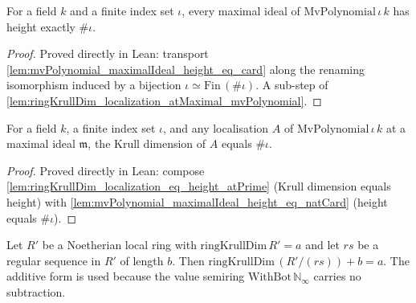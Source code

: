 \begin{lemma}
  \label{lem:mvPolynomial_maximalIdeal_height_eq_natCard}
  For a field \(k\) and a finite index set \(\iota\), every maximal ideal of
  \(\mathrm{MvPolynomial}\,\iota\,k\) has height exactly \(\#\iota\).
\end{lemma}

\begin{proof}
  Proved directly in Lean: transport
  \cref{lem:mvPolynomial_maximalIdeal_height_eq_card} along the renaming isomorphism
  induced by a bijection \(\iota \simeq \mathrm{Fin}\,(\#\iota)\). A sub-step of
  \cref{lem:ringKrullDim_localization_atMaximal_mvPolynomial}.
\end{proof}

\begin{lemma}
  \label{lem:ringKrullDim_localization_atMaximal_mvPolynomial}
  For a field \(k\), a finite index set \(\iota\), and any localisation \(A\) of
  \(\mathrm{MvPolynomial}\,\iota\,k\) at a maximal ideal \(\mathfrak m\), the Krull
  dimension of \(A\) equals \(\#\iota\).
\end{lemma}

\begin{proof}
  Proved directly in Lean: compose
  \cref{lem:ringKrullDim_localization_eq_height_atPrime} (Krull dimension equals
  height) with \cref{lem:mvPolynomial_maximalIdeal_height_eq_natCard} (height equals
  \(\#\iota\)).
\end{proof}

\begin{lemma}
  \label{lem:ringKrullDim_quotient_add_eq_regular_sequence}
  Let \(R'\) be a Noetherian local ring with \(\mathrm{ringKrullDim}\,R' = a\) and let
  \(rs\) be a regular sequence in \(R'\) of length \(b\). Then
  \(\mathrm{ringKrullDim}\,(R'/(rs)) + b = a\). The additive form is used because the
  value semiring \(\mathrm{WithBot}\,\mathbb N_\infty\) carries no subtraction.
\end{lemma}

